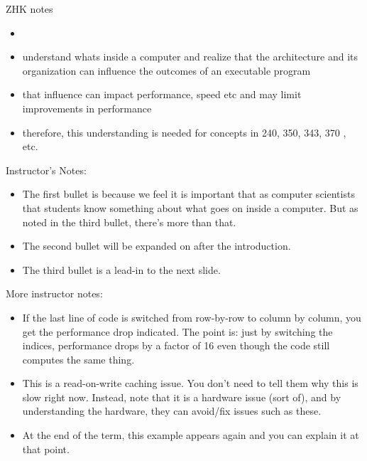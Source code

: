 \begin{frame}[fragile]
\BNotes\ifnum{}
ZHK notes
\begin{itemize}
\item 
    \item understand whats inside a computer and realize that the architecture and its organization can influence the outcomes of an executable program
    \item that influence can impact performance, speed etc and may limit improvements in performance
\item therefore, this understanding is needed for concepts in 240, 350, 343, 370 , etc. 
\end{itemize}
Instructor's Notes:
\begin{itemize}
\item The first bullet is because we feel it is important that
	as computer scientists that students know something about
	what goes on inside a computer.  But as noted in the third
	bullet, there's more than that.
\item The second bullet will be expanded on after the introduction.
\item The third bullet is a lead-in to the next slide.
\end{itemize}
More instructor notes:
\begin{itemize}
\item If the last line of code is switched from row-by-row to column by
	column, you get the performance drop indicated.  The point is:
	just by switching the indices, performance drops by a factor of
	16 even though the code still computes the same thing.

\item This is a read-on-write caching issue.  You don't need to tell them why this is
	slow right now.  Instead, note that it is a hardware issue (sort
	of), and by understanding the hardware, they can avoid/fix issues
	such as these.

\item At the end of the term, this example appears again and you can 
	explain it at that point.
\end{itemize}

\fi\ENotes
\end{frame}

